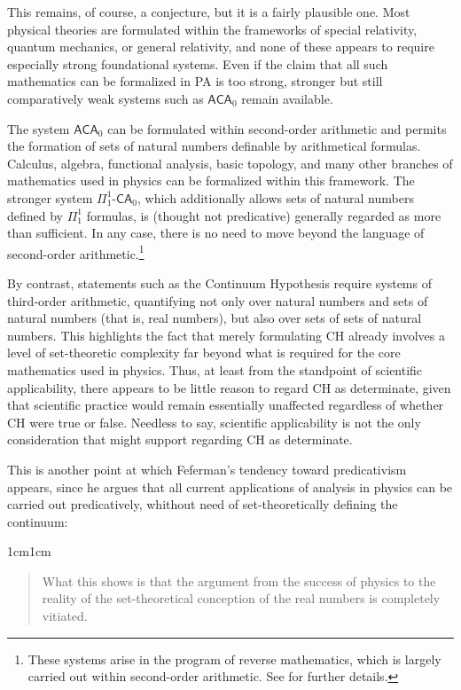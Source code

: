 \documentclass[11pt,a4paper]{article}
\theoremstyle{plain}
\begin{document}
This remains, of course, a conjecture, but it is a fairly plausible one. Most physical theories are formulated within the frameworks of special relativity, quantum mechanics, or general relativity, and none of these appears to require especially strong foundational systems. Even if the claim that all such mathematics can be formalized in PA is too strong, stronger but still comparatively weak systems such as $\mathsf{ACA}_0$ remain available.

The system $\mathsf{ACA}_0$ can be formulated within second-order arithmetic and permits the formation of sets of natural numbers definable by arithmetical formulas. Calculus, algebra, functional analysis, basic topology, and many other branches of mathematics used in physics can be formalized within this framework. The stronger system $\Pi^1_1\text{-}\mathsf{CA}_0$, which additionally allows sets of natural numbers defined by $\Pi^1_1$ formulas, is (thought not predicative) generally regarded as more than sufficient. In any case, there is no need to move beyond the language of second-order arithmetic.\footnote{These systems arise in the program of reverse mathematics, which is largely carried out within second-order arithmetic. See \textcite{Simpson2006} for further details.}

By contrast, statements such as the Continuum Hypothesis require systems of third-order arithmetic, quantifying not only over natural numbers and sets of natural numbers (that is, real numbers), but also over sets of sets of natural numbers. This highlights the fact that merely formulating CH already involves a level of set-theoretic complexity far beyond what is required for the core mathematics used in physics. Thus, at least from the standpoint of scientific applicability, there appears to be little reason to regard CH as determinate, given that scientific practice would remain essentially unaffected regardless of whether CH were true or false. Needless to say, scientific applicability is not the only consideration that might support regarding CH as determinate.

This is another point at which Feferman's tendency toward predicativism appears, since he argues \parencite[p.~22]{Feferman2011a} that all current applications of analysis in physics can be carried out predicatively, whithout need of set-theoretically defining the continuum:

\begin{adjustwidth}{1cm}{1cm}
\begin{quote}
\small
What this shows is that the argument from the success of physics to the reality of the set-theoretical conception of the real numbers is completely vitiated.
\end{quote}
\end{adjustwidth}
\end{document}

